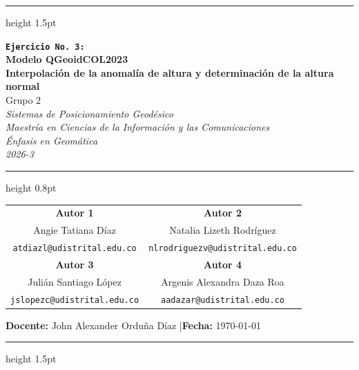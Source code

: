 \documentclass[11pt,letterpaper]{article}
\begin{document}

\begin{center}
    {\color{mainBlue}\hrule height 1.5pt}
    \vspace{0.4cm}
    {\Large \textbf{\texttt{Ejercicio No.\ 3:}\\
    \vspace{0.4cm}
    Modelo QGeoidCOL2023\\
    \vspace{0.15cm}
    \large Interpolación de la anomalía de altura y determinación de la altura normal}} \\
    \vspace{0.2cm}
    Grupo 2 \\
    \vspace{0.4cm}
    {\large \textit{Sistemas de Posicionamiento Geodésico}}\\
    {\large \textit{Maestría en Ciencias de la Información y las Comunicaciones \\ Énfasis en Geomática\\ 2026-3}} \\
    \vspace{0.4cm}
    {\color{mainBlue!30}\hrule height 0.8pt}
    \vspace{0.2cm}

    \begin{tabular}{cc}
        \textbf{Autor 1} & \textbf{Autor 2} \\[0.2cm]
        Angie Tatiana Díaz & Natalia Lizeth Rodríguez \\[0.1cm]
        \footnotesize \texttt{atdiazl@udistrital.edu.co} &
        \footnotesize \texttt{nlrodriguezv@udistrital.edu.co} \\[0.5cm]
        \textbf{Autor 3} & \textbf{Autor 4} \\[0.2cm]
        Julián Santiago López & Argenis Alexandra Daza Roa \\[0.1cm]
        \footnotesize \texttt{jslopezc@udistrital.edu.co} &
        \footnotesize \texttt{aadazar@udistrital.edu.co}
    \end{tabular}

    \vspace{0.5cm}
    \small \textbf{Docente:} John Alexander Orduña Díaz \quad|\quad \textbf{Fecha:} \today
    \vspace{0.2cm}
    {\color{mainBlue}\hrule height 1.5pt}
\end{center}
\end{document}
